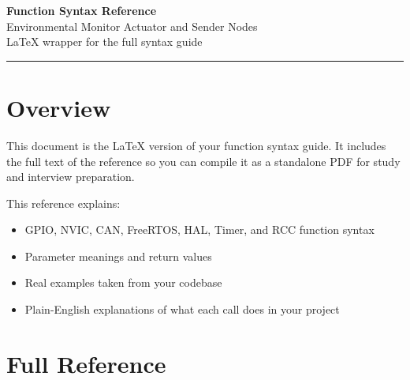 \documentclass[11pt,a4paper]{article}
\begin{document}
\begin{center}
  \vspace*{1.2cm}
  {\Huge\bfseries\color{accentblue} Function Syntax Reference}\\[1em]
  {\Large Environmental Monitor Actuator and Sender Nodes}\\[1em]
  {\large LaTeX wrapper for the full syntax guide}\\[1.5em]
  \rule{0.8\textwidth}{0.4pt}
\end{center}

\section{Overview}

This document is the LaTeX version of your function syntax guide. It includes the full text of the reference so you can compile it as a standalone PDF for study and interview preparation.

\begin{infobox}
This reference explains:
\begin{itemize}
  \item GPIO, NVIC, CAN, FreeRTOS, HAL, Timer, and RCC function syntax
  \item Parameter meanings and return values
  \item Real examples taken from your codebase
  \item Plain-English explanations of what each call does in your project
\end{itemize}
\end{infobox}

\section{Full Reference}

{\footnotesize
{}
}
\end{document}
